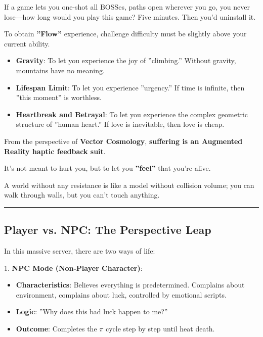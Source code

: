 If a game lets you one-shot all BOSSes, paths open wherever you go, you never lose---how long would you play this game? Five minutes. Then you'd uninstall it.

To obtain \textbf{''Flow''} experience, challenge difficulty must be slightly above your current ability.

\begin{itemize}
\item \textbf{Gravity}: To let you experience the joy of ''climbing.'' Without gravity, mountains have no meaning.

\item \textbf{Lifespan Limit}: To let you experience ''urgency.'' If time is infinite, then ''this moment'' is worthless.

\item \textbf{Heartbreak and Betrayal}: To let you experience the complex geometric structure of ''human heart.'' If love is inevitable, then love is cheap.
\end{itemize}

From the perspective of \textbf{Vector Cosmology}, \textbf{suffering is an Augmented Reality haptic feedback suit}.

It's not meant to hurt you, but to let you \textbf{''feel''} that you're alive.

A world without any resistance is like a model without collision volume; you can walk through walls, but you can't touch anything.

\hrule

\subsection{Player vs. NPC: The Perspective Leap}

In this massive server, there are two ways of life:

1.  \textbf{NPC Mode (Non-Player Character)}:

    \begin{itemize}
    \item \textbf{Characteristics}: Believes everything is predetermined. Complains about environment, complains about luck, controlled by emotional scripts.

    \item \textbf{Logic}: ''Why does this bad luck happen to me?''

    \item \textbf{Outcome}: Completes the $\pi$ cycle step by step until heat death.
    \end{itemize}

